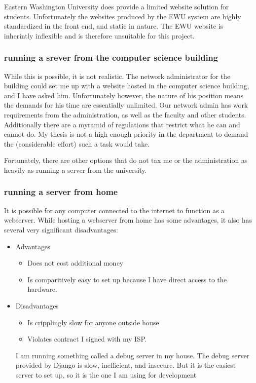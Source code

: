 Eastern Washington University does provide a limited website solution for students.  Unfortunately the websites produced by the EWU system are highly standardized in the front end, and static in nature.  The EWU website is inherintly inflexible and is therefore unsuitable for this project.

\subsubsection{running a srever from the computer science building}

While this is possible, it is not realistic.  The network administrator for the building could set me up with a website hosted in the computer science building, and I have asked him.  Unfortunately however, the nature of his position means the demands for his time are essentially unlimited.  Our network admin has work requirements from the administration, as well as the faculty and other students.  Additionally there are a myramid of regulations that restrict what he can and cannot do.  My thesis is not a high enough priority in the department to demand the (considerable effort) such a task would take.

Fortunately, there are other options that do not tax me or the administration as heavily as running a server from the university.


\subsubsection{running a server from home}

It is possible for any computer connected to the internet to function as a webserver.  While hosting a webserver from home has some advantages, it also has several very significant disadvantages:

\begin{itemize}
    \item Advantages
    \begin{itemize}
        \item Does not cost additional money
        \item Is comparitively easy to set up because I have direct access to the hardware.
    \end{itemize}
    \item Disadvantages
    \begin{itemize}
        \item Is cripplingly slow for anyone outside house
        \item Violates contract I signed with my ISP.
    \end{itemize}

    I am running something called a debug server in my house.  The debug server provided by Django is slow, inefficient, and insecure.  But it is the easiest server to set up, so it is the one I am using for development

\end{itemize}

